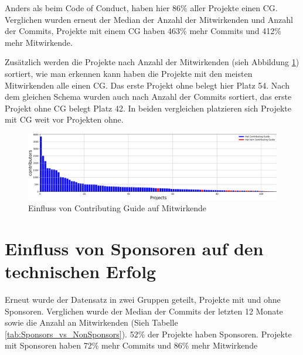Anders als beim Code of Conduct, haben hier 86\% aller Projekte einen CG. Verglichen wurden erneut
der Median der Anzahl der Mitwirkenden und Anzahl der Commits, Projekte mit einem CG haben 463\% mehr
Commits und 412\% mehr Mitwirkende.

Zusätzlich werden die Projekte nach Anzahl der Mitwirkenden (sieh Abbildung \ref{abb:ContributingGuide_vs_Contributors})
sortiert, wie man erkennen kann haben die Projekte mit den meisten Mitwirkenden alle einen CG. Das
erste Projekt ohne belegt hier Platz 54. Nach dem gleichen Schema wurden auch nach Anzahl der Commits
sortiert, das erste Projekt ohne CG belegt Platz 42.
In beiden vergleichen platzieren sich Projekte mit CG weit vor Projekten ohne.

\begin{figure}[h]
    \centering
    \includegraphics[scale=0.42]{figures/05/Contributors_Projects_asBarChart.png}
    \caption{Einfluss von Contributing Guide auf Mitwirkende}
    \label{abb:ContributingGuide_vs_Contributors}
\end{figure}



\section{Einfluss von Sponsoren auf den technischen Erfolg}\label{sec:sponsoren_datenerhebung}


Erneut wurde der Datensatz in zwei Gruppen geteilt, Projekte mit und ohne Sponsoren. Verglichen wurde
der Median der Commits der letzten 12 Monate sowie die Anzahl an Mitwirkenden 
(Sieh Tabelle \ref{tab:Sponsors_vs_NonSponsors}).
52\% der Projekte haben Sponsoren. Projekte mit Sponsoren haben 72\% mehr Commits und 86\% mehr Mitwirkende


